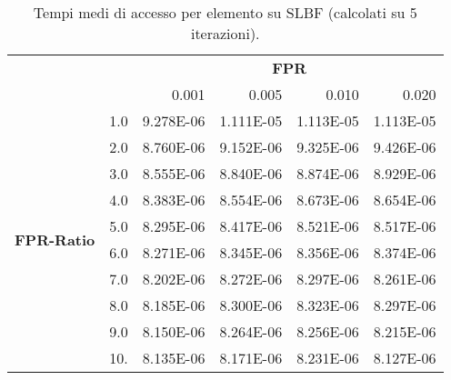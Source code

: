 \documentclass[4apaper,11pt]{report}
\begin{document}
    \begin{table}[H]
        \centering
        \begin{tabular}{llrrrr}
        \toprule
        {} & & \multicolumn{4}{c}{\textbf{FPR}}\\
        {} & &    0.001 &     0.005 &     0.010 &     0.020 \\
        \midrule
        \multirow{10}{*}{\textbf{FPR-Ratio}} &1.0 & 9.278E-06 & 1.111E-05 & 1.113E-05 & 1.113E-05 \\
        &2.0 & 8.760E-06 & 9.152E-06 & 9.325E-06 & 9.426E-06 \\
        &3.0 & 8.555E-06 & 8.840E-06 & 8.874E-06 & 8.929E-06 \\
        &4.0 & 8.383E-06 & 8.554E-06 & 8.673E-06 & 8.654E-06 \\
        &5.0 & 8.295E-06 & 8.417E-06 & 8.521E-06 & 8.517E-06 \\
        &6.0 & 8.271E-06 & 8.345E-06 & 8.356E-06 & 8.374E-06 \\
        &7.0 & 8.202E-06 & 8.272E-06 & 8.297E-06 & 8.261E-06 \\
        &8.0 & 8.185E-06 & 8.300E-06 & 8.323E-06 & 8.297E-06 \\
        &9.0 & 8.150E-06 & 8.264E-06 & 8.256E-06 & 8.215E-06 \\
        &10. & 8.135E-06 & 8.171E-06 & 8.231E-06 & 8.127E-06 \\
        \bottomrule
        \end{tabular}
        \caption{Tempi medi di accesso per elemento su SLBF (calcolati su 5 iterazioni).}
    \end{table}
\end{document}

